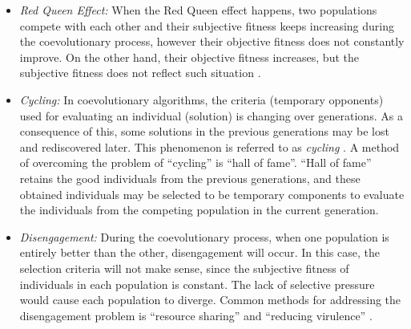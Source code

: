 \begin{itemize}

\item \textit{Red Queen Effect:} When the Red Queen effect happens, two populations compete with each other and their subjective fitness keeps increasing during the coevolutionary process, however their objective fitness does not constantly improve. On the other hand, their objective fitness increases, but the subjective fitness does not reflect such situation \cite{Bongard2005}. 

\item \textit{Cycling:} In coevolutionary algorithms, the criteria (temporary opponents) used for evaluating an individual (solution) is changing over generations. As a consequence of this, some solutions in the previous generations may be lost and rediscovered later. This phenomenon is referred to as \textit{cycling} \cite{John_2004}. A method of overcoming the problem of ``cycling'' is ``hall of fame''\cite{Rosin_1997}. ``Hall of fame'' retains the good individuals from the previous generations, and these obtained individuals may be selected to be temporary components to evaluate the individuals from the competing population in the current generation.

\item \textit{Disengagement:} During the coevolutionary process, when one population is entirely better than the other, disengagement will occur. In this case, the selection criteria will not make sense, since the subjective fitness of individuals in each population is constant. The lack of selective pressure would cause each population to diverge. Common methods for addressing the disengagement problem is ``resource sharing'' \cite{Juille98coevolvingthe} and ``reducing virulence'' \cite{John_2004}. 


\end{itemize}

